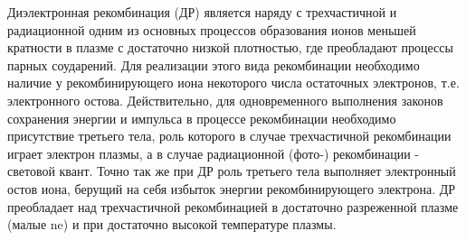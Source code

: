 \documentclass[10pt, a4paper]{article}
\begin{document}
Диэлектронная рекомбинация (ДР) является наряду с трехчастичной и радиационной одним из основных процессов образования ионов меньшей кратности в плазме с достаточно низкой плотностью, где преобладают процессы парных соударений. Для реализации этого вида рекомбинации необходимо наличие у рекомбинирующего иона некоторого числа остаточных электронов, т.е. электронного остова. Действительно, для одновременного выполнения законов сохранения энергии и импульса в процессе рекомбинации необходимо присутствие третьего тела, роль которого в случае трехчастичной рекомбинации играет электрон плазмы, а в случае радиационной (фото-) рекомбинации - световой квант. Точно так же при ДР роль третьего тела выполняет электронный остов иона, берущий на себя избыток энергии рекомбинирующего электрона.  ДР преобладает над трехчастичной рекомбинацией в достаточно разреженной плазме (малые ne) и при достаточно высокой температуре плазмы.
\end{document}
